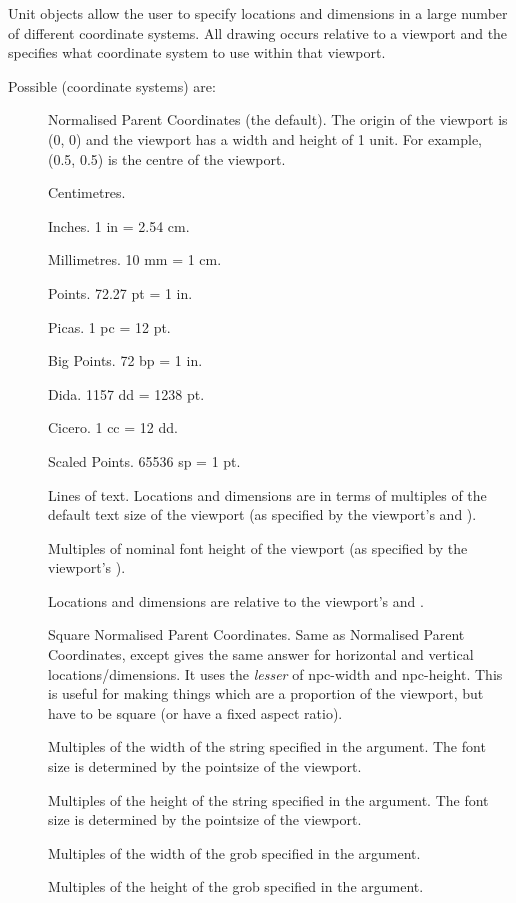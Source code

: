 %
\begin{Details}\relax
Unit objects allow the user to specify locations and dimensions
in a large number of different coordinate systems.  All drawing
occurs relative to a viewport and the  specifies
what coordinate system to use within that viewport.

Possible  (coordinate systems) are:
\begin{description}

\item[] Normalised Parent Coordinates (the default).
The origin of the viewport is (0, 0) and the viewport has a width
and height of 1 unit.  For example, (0.5, 0.5) is the centre of
the viewport.
\item[] Centimetres.
\item[] Inches.  1 in = 2.54 cm.
\item[] Millimetres.  10 mm = 1 cm.
\item[] Points.  72.27 pt = 1 in.
\item[] Picas.  1 pc = 12 pt.
\item[] Big Points.  72 bp = 1 in.
\item[] Dida. 1157 dd = 1238 pt.
\item[] Cicero.  1 cc = 12 dd.
\item[] Scaled Points.  65536 sp = 1 pt.
\item[] Lines of text.  Locations and dimensions
are in terms of multiples of the default text size of the viewport
(as specified by the viewport's  and ).
\item[] Multiples of nominal font height of the
viewport (as specified by the viewport's ).
\item[] Locations and dimensions are relative to
the viewport's  and .
\item[] Square Normalised Parent Coordinates.
Same as Normalised Parent Coordinates, except gives the same answer for
horizontal and vertical locations/dimensions.  It uses the
\emph{lesser} of npc-width and npc-height.  This is useful for making
things which are a proportion of the viewport, but have to be square 
(or have a fixed aspect ratio).
\item[] Multiples of the width of the string
specified in the  argument.  The font size is
determined by the pointsize of the viewport.
\item[] Multiples of the height of the string
specified in the  argument.  The font size is
determined by the pointsize of the viewport.
\item[] Multiples of the width of the grob
specified in the  argument.
\item[] Multiples of the height of the grob
specified in the  argument.


\end{description}
\end{Details}
